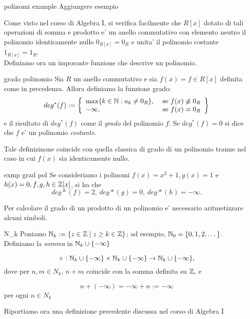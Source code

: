 \begin{example}[]{polinomi example}
Aggiungere esempio
\end{example}
Come visto nel corso di Algebra I, si verifica facilmente che $R[x]$ dotato di 
tali operazioni di somma e prodotto e' un anello commutativo con elemento neutro il polinomio
identicamente nullo $0_{R[x]} = 0_R$ e unita' il polinomio costante $1_{R[x]} = 1_R$.\\
Definiamo ora un imporante funzione che descrive un polinomio.

\newpage
\begin{defn}{grado polinomio}
Sia $R$ un anello commutativo e sia $f(x) = f \in R[x]$ definita come in precedenza. Allora definiamo
la funzione grado:
\begin{equation}
  deg^*(f) := \left\{\begin{array}{lr}
      \max\{k \in \mathbb{N} : a_k \neq 0_R\}, & \text{ se } f(x) \not\equiv 0_R\\
      -\infty, & \text{ se } f(x) \equiv 0_R 
      \end{array}\right\} 
\end{equation}
e il risultato di $deg^*(f)$ come il \emph{grado} del polinomio $f$. Se $deg^*(f) = 0$ si dice che $f$
e' un polinomio \emph{costante}.
\end{defn}
Tale definizinone coincide con quella classica di grado di un polinomio tranne
nel caso in cui $f(x)$ sia identicamente nullo. 

\begin{example}{exmp grad pol}
Se consideriamo i polinomi $f(x) = x^2 + 1, g(x) = 1$ e $h(x) = 0, f,g,h \in \mathbb{Z}[x]$, si ha che
\[deg*(f) = 2,\ deg*(g) = 0,\ deg*(h) = -\infty.\]
\end{example}
Per calcolare il grado di un prodotto di un polinomio e' necessario aritmetizzare
alcuni simboli.

\begin{defn}{N_k}
Poniamo $\mathbb{N}_k := \{z \in \mathbb{Z} \mid z \geq k \in \mathbb{Z}\}$; ad esempio, $\mathbb{N}_0 = \{0, 1, 2, \dots\}$.\\
Definiamo la \emph{somma} in $\mathbb{N}_k \cup \{-\infty\}$

\[+ : \mathbb{N}_k \cup \{-\infty\} \times \mathbb{N}_k \cup \{-\infty\} \to \mathbb{N}_k \cup \{-\infty\},\]
dove per $n, m \in N_k$, $n+m$ coincide con la somma definita su $\mathbb{Z}$, e

\begin{equation}\label{sum_N_k}
n + (-\infty) = -\infty + n := -\infty
\end{equation}
per ogni $n \in N_k$
\end{defn}
Riportiamo ora una definizione precedente discussa nel corso di Algebra I

